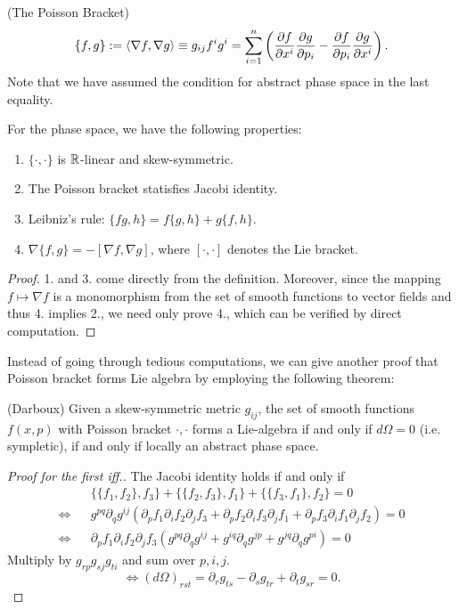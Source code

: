 \begin{definition}
	(The Poisson Bracket) \[\{ f, g \} := \left< \nabla f, \nabla g \right> \equiv g_{ij} f^i g^i = \sum_{i = 1}^{n} \left( \frac{ \partial f}{ \partial x^i } \frac{ \partial g}{ \partial p_i } - \frac{ \partial f}{ \partial p_i } \frac{ \partial g}{ \partial x^i } \right). \]
	Note that we have assumed the condition for abstract phase space in the last equality.
\end{definition}

\begin{fact}
	For the phase space, we have the following properties:
	\begin{enumerate}
		\item $\{ \cdot, \cdot\}$ is $\mathbb{R}$-linear and skew-symmetric.
		\item The Poisson bracket statisfies Jacobi identity.
		\item Leibniz's rule: $\{fg, h\} = f\{g, h\} + g\{ f, h\}$.
		\item $\nabla \{f, g\} = - [\nabla f, \nabla g]$, where $[ \cdot, \cdot ]$ denotes the Lie bracket.
	\end{enumerate}
\end{fact}
\begin{proof}
	1. and 3. come directly from the definition. Moreover, since the mapping $f \mapsto \nabla f$ is a monomorphism from the set of smooth functions to vector fields and thus 4. implies 2., we need only prove 4., which can be verified by direct computation.
\end{proof}

Instead of going through tedious computations, we can give another proof that Poisson bracket forms Lie algebra by employing the following theorem:

\begin{theorem}
	(Darboux) Given a skew-symmetric metric $g_{ij}$, the set of smooth functions $f(x, p)$ with Poisson bracket ${ \cdot , \cdot}$ forms a Lie-algebra if and only if $d\Omega = 0$ (i.e. sympletic), if and only if locally an abstract phase space.
	\label{thm:darboux}
\end{theorem}
\begin{proof}[Proof for the first iff.] The Jacobi identity holds if and only if
	\begin{eqnarray}
		&&\{ \{ f_1, f_2 \}, f_3 \} + \{ \{ f_2, f_3 \}, f_1 \} + \{ \{ f_3, f_1 \}, f_2 \} = 0
		\nonumber\\
		\iff && g^{pq} \partial_q g^{ij} \left(\partial_p f_1 \partial_i f_2 \partial_j f_3 + \partial_p f_2 \partial_i f_3 \partial_j f_1 + \partial_p f_3 \partial_i f_1 \partial_j f_2 \right) = 0
		\nonumber\\
		\iff && \partial_p f_1 \partial_i f_2 \partial_j f_3 \left( g^{pq} \partial_q g^{ij} + g^{iq} \partial_q g^{jp} + g^{jq} \partial_q g^{pi} \right) = 0
		\nonumber
	\end{eqnarray}
	Multiply by $g_{rp}g_{sj}g_{ti}$ and sum over $p, i, j$.
	\[ \iff (d\Omega)_{rst} = \partial_{r} g_{ts} - \partial_{s} g_{tr} + \partial_{t} g_{sr} = 0. \]
\end{proof}

